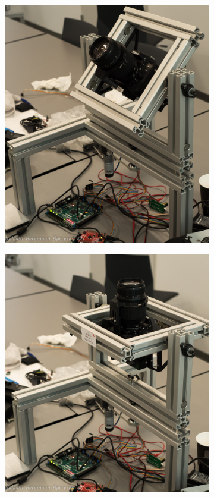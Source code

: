 \begin{figure}[!h]
    \centering
    \begin{subfigure}[b]{0.3\textwidth}
       \includegraphics[width=1\textwidth]{Billeder/Tilt45deg.jpg}
        \caption{}
        \label{fig:tilt_spejl1}
    \end{subfigure}
  \begin{subfigure}[b]{0.3\textwidth}
        \includegraphics[width=1\textwidth]{Billeder/Nulpunkt.jpg}

\end{subfigure}
\end{figure}
